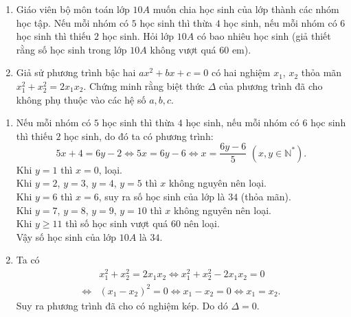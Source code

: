 \begin{ex}%
    \hfill
    \begin{enumerate}
\item Giáo viên bộ môn toán lớp $10A$ muốn chia học sinh của lớp thành các nhóm học tập. Nếu mỗi nhóm có $5$ học sinh thì thừa $4$ học sinh, nếu mỗi nhóm có $6$ học sinh thì thiếu $2$ học sinh. Hỏi lớp $10A$ có bao nhiêu học sinh (giả thiết rằng số học sinh trong lớp $10A$ không vượt quá $60$ em). 
\item   Giả sử phương trình bậc hai $ax^2+bx+c=0$ có hai nghiệm $x_{1}$, $x_{2}$ thỏa mãn $x_{1}^{2}+x_{2}^{2}=2{x}_{1}{x}_{2}$. Chứng minh rằng biệt thức $\Delta $ của phương trình đã cho không phụ thuộc vào các hệ số $a, b, c$.
 \end{enumerate}
\loigiai
    {
   \begin{enumerate}
 \item Nếu mỗi nhóm có $5$ học sinh thì thừa $4$ học sinh, nếu mỗi nhóm có $6$ học sinh thì thiếu $2$ học sinh, do đó ta có phương trình:
$$5x + 4 = 6y - 2 \Leftrightarrow 5x = 6y - 6 \Leftrightarrow x = \frac{6y - 6}{5}\,\,(x,y \in \mathbb{N}^*).$$
Khi $y=1$ thì $x=0$, loại.\\
Khi $y=2$, $y=3$, $y=4$, $y=5$ thì $x$ không nguyên nên loại.\\
Khi $y=6$ thì $x=6$, suy ra số học sinh của lớp là $34$ (thỏa mãn).\\
Khi $y=7$, $y=8$, $y=9$, $y=10$ thì $x$ không nguyên nên loại.\\
Khi $y\ge 11$ thì số học sinh vượt quá $60$ nên loại.\\
Vậy số học sinh của lớp $10A$ là $34$.
        \item Ta có
       {\allowdisplaybreaks
       \begin{align*} &x_{1}^{2}+x_{2}^{2}=2{x}_{1}{x}_{2}
       \Leftrightarrow x_1^2+x_2^2-2x_1x_2=0\\
      \Leftrightarrow&\left( x_1-x_2 \right)^{2}=0
        \Leftrightarrow x_1-x_2=0\Leftrightarrow x_1=x_2.
       \end{align*}}Suy ra phương trình đã cho có nghiệm kép. Do dó $\Delta =0$.
   \end{enumerate}
    }
\end{ex}


